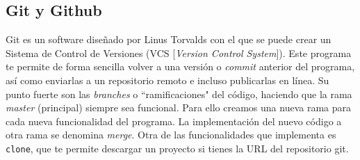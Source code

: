 \documentclass[a4paper, 11pt]{report} %
\begin{document}
\subsection{Git y Github}
Git es un software diseñado por Linus Torvalds con el que se puede crear un Sistema de
Control de Versiones (VCS [\textit{Version Control System}]). Este programa te permite
de forma sencilla volver a una versión o \textit{commit} anterior del programa, así
como enviarlas a un \gls{repositorio} remoto e incluso publicarlas en línea. Su punto fuerte
son las \textit{branches} o ``ramificaciones" del código, haciendo que la rama
\textit{master} (principal) siempre sea funcional. Para ello creamos una nueva rama para cada nueva funcionalidad del programa. La implementación del nuevo código a otra rama se denomina \textit{merge}. Otra de las funcionalidades que implementa es \texttt{clone}, que te permite descargar un proyecto si tienes la URL del \gls{repositorio} git.
\end{document}
